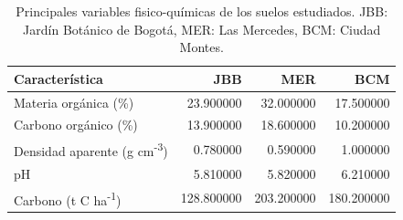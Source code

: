 \documentclass{article}
\begin{document}
\begin{table}[h]
	\centering
\begin{tabular}{lrrr}
\toprule
Característica & JBB & MER & BCM \\
\midrule
Materia orgánica (\%) & 23.900000 & 32.000000 & 17.500000 \\
Carbono orgánico (\%) & 13.900000 & 18.600000 & 10.200000 \\
Densidad aparente (g cm\textsuperscript{-3}) & 0.780000 & 0.590000 & 1.000000 \\
pH & 5.810000 & 5.820000 & 6.210000 \\
Carbono (t C ha\textsuperscript{-1}) & 128.800000 & 203.200000 & 180.200000 \\
\bottomrule
\end{tabular}
\caption[Variables fisico-químicas]{Principales variables fisico-químicas de los suelos estudiados. JBB: Jardín Botánico de Bogotá, MER: Las Mercedes, BCM: Ciudad Montes.}
\label{sue_tab}
\end{table}


\clearpage

\newpage
\end{document}
